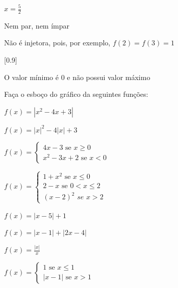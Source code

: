 \begin{exercises*}
\begin{exercise}
  \begin{answer}
    \begin{alphalist}
      \item $x=\frac{5}{2}$
      \item Nem par, nem ímpar
      \item Não é injetora, pois, por exemplo, $f(2)=f(3)=1$
      \item {}[0.9]
      \item O valor mínimo é 0 e não possui valor máximo
    \end{alphalist}
  \end{answer}
\end{exercise}

\begin{exercise}
  Faça o esboço do gráfico da seguintes funções:
  \begin{alphalist}
    \item $f(x)=|x^2-4x+3|$
    \item $f(x)= |x|^2-4|x|+3$
    \item $f(x)=\left\{\begin{array}{cc} 4x-3 \text{ se } x \geq
          0\\
          x^2-3x+2 \text{ se } x <0
          \end{array}\right.$
    \item $ f(x)=\left\{\begin{array}{cc} 1+x^2 \text{ se } x \leq
          0\\
          2-x \text{ se } 0 < x \leq 2 \\
          (x-2)^2  \,\,se \,\,  x> 2
          \end{array}\right.$
    \item $f(x)=|x-5|+1$
    \item $f(x)= |x-1|+ |2x-4|$
    \item $f(x)=\frac{|x|}{x}$
    \item $ f(x)=\left\{\begin{array}{cc} 1 \text{ se } x \leq
          1\\
          |x-1| \text{ se } x>1
          \end{array}\right.$
  \end{alphalist}


\end{exercise}
\end{exercises*}
